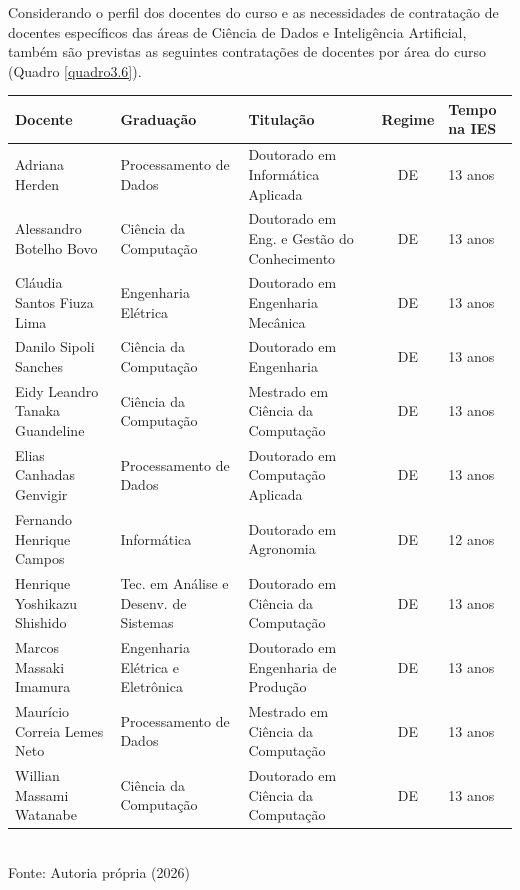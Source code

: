 Considerando o perfil dos docentes do curso e as necessidades de contratação de docentes específicos das áreas de Ciência de Dados e Inteligência Artificial, também são previstas as seguintes contratações de docentes por área do curso (Quadro \ref{quadro3.6}).

\begin{quadro}[ht]
\caption{Formação, titulação, regime de trabalho e tempo de experiência no magistério superior}
\label{quadro3.1}
\centering

\begin{tabular}{|p{3cm}|p{3cm}|p{3cm}|c|p{2cm}|}
\hline
\textbf{Docente} & \textbf{Graduação} & \textbf{Titulação} & \textbf{Regime} & \textbf{Tempo na IES} \\ \hline
Adriana Herden & Processamento de Dados & Doutorado em Informática Aplicada & DE & 13 anos \\ \hline
Alessandro Botelho Bovo & Ciência da Computação & Doutorado em Eng. e Gestão do Conhecimento & DE & 13 anos \\ \hline
Cláudia Santos Fiuza Lima & Engenharia Elétrica & Doutorado em Engenharia Mecânica & DE & 13 anos \\ \hline
Danilo Sipoli Sanches & Ciência da Computação & Doutorado em Engenharia & DE & 13 anos \\ \hline
Eidy Leandro Tanaka Guandeline & Ciência da Computação & Mestrado em Ciência da Computação & DE & 13 anos \\ \hline
Elias Canhadas Genvigir & Processamento de Dados & Doutorado em Computação Aplicada & DE & 13 anos \\ \hline
Fernando Henrique Campos & Informática & Doutorado em Agronomia & DE & 12 anos \\ \hline
Henrique Yoshikazu Shishido & Tec. em Análise e Desenv. de Sistemas & Doutorado em Ciência da Computação & DE & 13 anos \\ \hline
Marcos Massaki Imamura & Engenharia Elétrica e Eletrônica & Doutorado em Engenharia de Produção & DE & 13 anos \\ \hline
Maurício Correia Lemes Neto & Processamento de Dados & Mestrado em Ciência da Computação & DE & 13 anos \\ \hline
Willian Massami Watanabe & Ciência da Computação & Doutorado em Ciência da Computação & DE & 13 anos \\ \hline
\end{tabular}
\small \\ Fonte: Autoria própria (2026)
\end{quadro}

